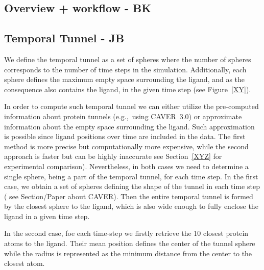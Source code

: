 \documentclass[twocolumn]{bmcart}%
\newcommand{\eg}{e.g.,~}
\begin{document}
\subsection*{Overview + workflow - BK}

\subsection*{Temporal Tunnel - JB}
\label{Sec:TemporalTunnel}


We define the temporal tunnel as a set of spheres where the number of spheres corresponds to the number of time steps in the simulation.
Additionally, each sphere defines the maximum empty space surrounding the ligand, and as the consequence also contains the ligand, in the given time step {\color{red}(see Figure~\ref{XY})}.

In order to compute such temporal tunnel we can either utilize the pre-computed information about protein tunnels (\eg using CAVER~3.0) or approximate information about the empty space surrounding the ligand. Such approximation is possible since ligand positions over time are included in the data.
The first method is more precise but computationally more expensive, while the second approach is faster but {\color{red}can be highly inaccurate} {\color{red}see Section~\ref{XYZ} for experimental comparison)}. 
Nevertheless, in both cases we need to determine a single sphere, being a part of the temporal tunnel, for each time step.
In the first case, we obtain a set of spheres defining the shape of the tunnel in each time step ({\color{red} see Section/Paper about CAVER}). Then the entire temporal tunnel is formed by the closest sphere to the ligand, which is also wide enough  to fully enclose the ligand in a given time step.

In the second case, foe each time-step we firstly retrieve the 10 closest protein atoms to the ligand. Their mean position defines the center of the tunnel sphere while the radius is represented as the minimum distance from the center to the closest atom.

\end{document}

